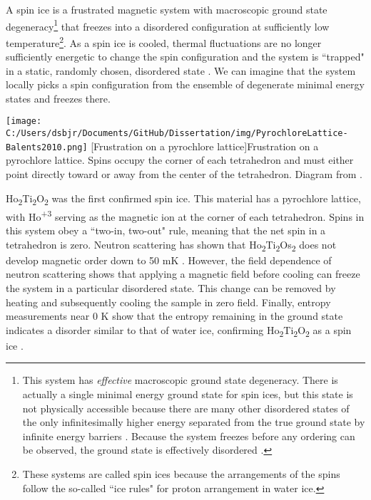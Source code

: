 A spin ice is a frustrated magnetic system with macroscopic ground state degeneracy\footnote{This system has \textit{effective} macroscopic ground state degeneracy. There is actually a single minimal energy ground state for spin ices, but this state is not physically accessible because there are many other disordered states of the only infinitesimally higher energy separated from the true ground state by infinite energy barriers \cite{Siddharthan2001}. Because the system freezes before any ordering can be observed, the ground state is effectively disordered \cite{Castelnovo2012}.} that freezes into a disordered configuration at sufficiently low temperature\footnote{These systems are called spin ices because the arrangements of the spins follow the so-called ``ice rules" for proton arrangement in water ice.}. As a spin ice is cooled, thermal fluctuations are no longer sufficiently energetic to change the spin configuration and the system is ``trapped" in a static, randomly chosen, disordered state \cite{Bramwell2001}. We can imagine that the system locally picks a spin configuration from the ensemble of degenerate minimal energy states and freezes there.

\begin{centering}
\texttt{[image: C:/Users/dsbjr/Documents/GitHub/Dissertation/img/PyrochloreLattice-Balents2010.png]}
  \captionsetup{width=0.75\textwidth}
  [Frustration on a pyrochlore lattice]{Frustration on a pyrochlore lattice. Spins occupy the corner of each tetrahedron and must either point directly toward or away from the center of the tetrahedron. Diagram from \cite{Balents2010}.}
  \label{fig:pyrochlorelattice}
\end{centering}

Ho\textsubscript{2}Ti\textsubscript{2}O\textsubscript{2} was the first confirmed spin ice. This material has a pyrochlore lattice, with Ho\textsuperscript{+3} serving as the magnetic ion at the corner of each tetrahedron. Spins in this system obey a ``two-in, two-out" rule, meaning that the net spin in a tetrahedron is zero. Neutron scattering has shown that Ho\textsubscript{2}Ti\textsubscript{2}Os\textsubscript{2} does not develop magnetic order down to 50 mK \cite{Harris1997}. However, the field dependence of neutron scattering shows that applying a magnetic field before cooling can freeze the system in a particular disordered state. This change can be removed by heating and subsequently cooling the sample in zero field. Finally, entropy measurements near 0 K show that the entropy remaining in the ground state indicates a disorder similar to that of water ice, confirming Ho\textsubscript{2}Ti\textsubscript{2}O\textsubscript{2} as a spin ice \cite{Ramirez1999}.

